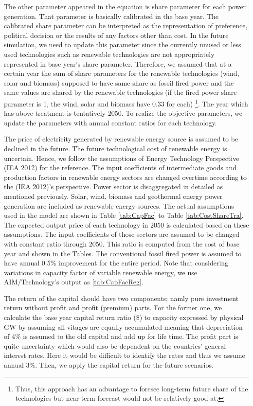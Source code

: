 \documentclass[10pt,a4paper,titlepage,dvipdfmx]{book}
\begin{document}
\begin{itemize}
The other parameter appeared in the equation is share parameter for each power generation. That parameter is basically calibrated in the base year. The calibrated share parameter can be interpreted as the representation of preference, political decision or the results of any factors other than cost. In the future simulation, we need to update this parameter since the currently unused or less used technologies such as renewable technologies are not appropriately represented in base year's share parameter. Therefore, we assumed that at a certain year the sum of share parameters for the renewable technologies (wind, solar and biomass) supposed to have same share as fossil fired power and the same values are shared by the renewable technologies (if the fired power share parameter is 1, the wind, solar and biomass have 0.33 for each) \footnote{Thus, this approach has an advantage to foresee long-term future share of the technologies but near-term forecast would not be relatively good at.}. The year which has above treatment is tentatively 2050. To realize the objective parameters, we update the parameters with annual constant ratios for each technology.

The price of electricity generated by renewable energy source is assumed to be declined in the future. The future technological cost of renewable energy is uncertain. Hence, we follow the assumptions of Energy Technology Perspective (IEA 2012) for the reference. The input coefficients of intermediate goods and production factors in renewable energy sectors are changed overtime according to the (IEA 2012)'s perspective. Power sector is disaggregated in detailed as mentioned previously. Solar, wind, biomass and geothermal energy power generation are included as renewable energy sources. The actual assumptions used in the model are shown in Table \ref{tab:CapFac} to Table \ref{tab:CostShareTra}. The expected output price of each technology in 2050 is calculated based on these assumptions. The input coefficients of those sectors are assumed to be changed with constant ratio through 2050. This ratio is computed from the cost of base year and shown in the Tables. The conventional fossil fired power is assumed to have annual 0.5\% improvement for the entire period. Note that considering variations in capacity factor of variable renewable energy, we use AIM/Technology's output as \ref{tab:CapFacReg}.

{The return of the capital should have two components; namly pure investment return without profit and profit (premium) parts. For the former one, we calculate the base year capital return ratio (\$) to capacity expressed by physical GW by assuming all vitages are equally accumulated meaning that depreciation of 4\% is assumed to the old capital and add up for life time. The profit part is quite uncertainty which would also be dependent on the countries' general interest rates. Here it would be difficult to identify the rates and thus we assume annual 3\%. Then, we apply the capital return for the future scenarios.}



\end{itemize}
\end{document}
